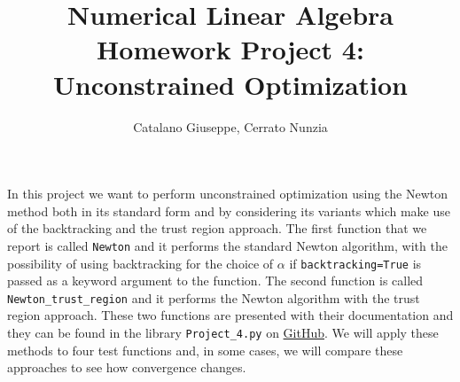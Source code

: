 \documentclass[a4paper,11pt]{article}
\begin{document}
	\author{Catalano Giuseppe, Cerrato Nunzia}
	\title{Numerical Linear Algebra Homework Project 4:\\Unconstrained Optimization}
	\date{}
	\maketitle
	
	\noindent In this project we want to perform unconstrained optimization using the Newton method both in its standard form and by considering its variants which make use of the backtracking and the trust region approach.
	The first function that we report is called \texttt{Newton} and it performs the standard Newton algorithm, with the possibility of using backtracking for the choice of $\alpha$ if \texttt{backtracking=True} is passed as a keyword argument to the function. The second function is called \texttt{Newton_trust_region} and it performs the Newton algorithm with the trust region approach. These two functions are presented with their documentation and they can be found in the library \texttt{Project_4.py} on \href{https://github.com/nunziacerrato/Numerical_Analysis_Optimization/blob/main/Project_4/Project_4.py}{GitHub}.
	We will apply these methods to four test functions and, in some cases, we will compare these approaches to see how convergence changes.
	
\end{document}
